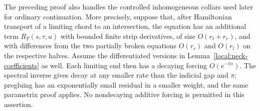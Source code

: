 \documentclass[11pt]{article}
\theoremstyle{definition}
\theoremstyle{remark}
\numberwithin{equation}{section}
\begin{document}
The preceding proof also handles the controlled inhomogeneous collars
used later for ordinary continuation.  More precisely, suppose that,
after Hamiltonian transport of a limiting chord to an intersection,
the equation has an additional term $R_T(s,\tau,u)$ with bounded finite
strip derivatives, of size $O(r_l+r_r)$, and with differences from the
two partially broken equations $O(r_r)$ and $O(r_l)$ on the respective
halves.  Assume the differentiated versions in
Lemma~\ref{local:neck-coefficients} as well.  Each limiting end then
has a decaying forcing $O(e^{-\pi s})$.  The spectral inverse gives
decay at any smaller rate than the indicial gap and $\pi$; pregluing
has an exponentially small residual in a smaller weight, and the
same parametrix proof applies.  No nondecaying additive forcing is
permitted in this assertion.
\end{document}
